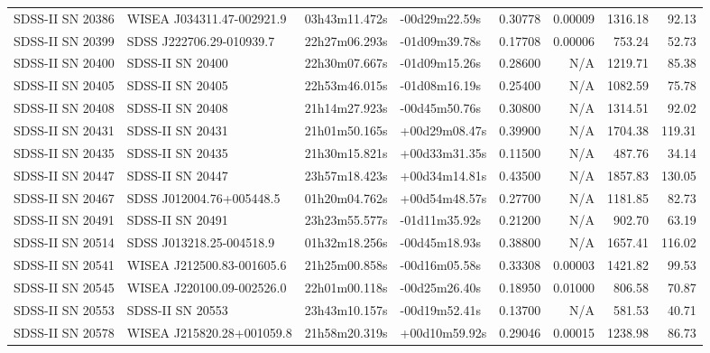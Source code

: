 \begin{longtable}{llllrrrr}
SDSS-II SN 20386 &       WISEA J034311.47-002921.9 &   03h43m11.472s &   -00d29m22.59s &  0.30778 &  0.00009 &  1316.18 &       92.13 \\
SDSS-II SN 20399 &        SDSS J222706.29-010939.7 &   22h27m06.293s &   -01d09m39.78s &  0.17708 &  0.00006 &   753.24 &       52.73 \\
SDSS-II SN 20400 &                SDSS-II SN 20400 &   22h30m07.667s &   -01d09m15.26s &  0.28600 &      N/A &  1219.71 &       85.38 \\
SDSS-II SN 20405 &                SDSS-II SN 20405 &   22h53m46.015s &   -01d08m16.19s &  0.25400 &      N/A &  1082.59 &       75.78 \\
SDSS-II SN 20408 &                SDSS-II SN 20408 &   21h14m27.923s &   -00d45m50.76s &  0.30800 &      N/A &  1314.51 &       92.02 \\
SDSS-II SN 20431 &                SDSS-II SN 20431 &   21h01m50.165s &   +00d29m08.47s &  0.39900 &      N/A &  1704.38 &      119.31 \\
SDSS-II SN 20435 &                SDSS-II SN 20435 &   21h30m15.821s &   +00d33m31.35s &  0.11500 &      N/A &   487.76 &       34.14 \\
SDSS-II SN 20447 &                SDSS-II SN 20447 &   23h57m18.423s &   +00d34m14.81s &  0.43500 &      N/A &  1857.83 &      130.05 \\
SDSS-II SN 20467 &        SDSS J012004.76+005448.5 &   01h20m04.762s &   +00d54m48.57s &  0.27700 &      N/A &  1181.85 &       82.73 \\
SDSS-II SN 20491 &                SDSS-II SN 20491 &   23h23m55.577s &   -01d11m35.92s &  0.21200 &      N/A &   902.70 &       63.19 \\
SDSS-II SN 20514 &        SDSS J013218.25-004518.9 &   01h32m18.256s &   -00d45m18.93s &  0.38800 &      N/A &  1657.41 &      116.02 \\
SDSS-II SN 20541 &       WISEA J212500.83-001605.6 &   21h25m00.858s &   -00d16m05.58s &  0.33308 &  0.00003 &  1421.82 &       99.53 \\
SDSS-II SN 20545 &       WISEA J220100.09-002526.0 &   22h01m00.118s &   -00d25m26.40s &  0.18950 &  0.01000 &   806.58 &       70.87 \\
SDSS-II SN 20553 &                SDSS-II SN 20553 &   23h43m10.157s &   -00d19m52.41s &  0.13700 &      N/A &   581.53 &       40.71 \\
SDSS-II SN 20578 &       WISEA J215820.28+001059.8 &   21h58m20.319s &   +00d10m59.92s &  0.29046 &  0.00015 &  1238.98 &       86.73 \\

\end{longtable}
